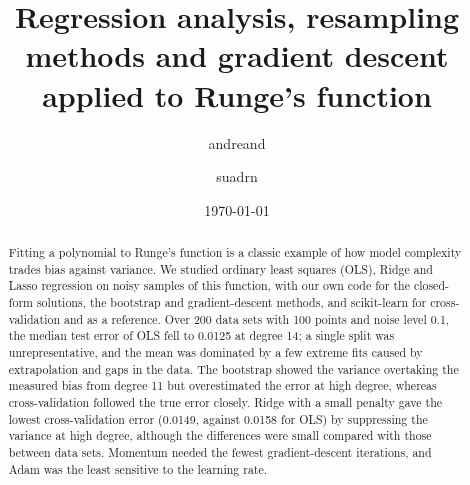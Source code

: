 \documentclass[english,notitlepage,reprint,nofootinbib,floatfix]{revtex4-2}
\begin{document}
\title{Regression analysis, resampling methods and gradient descent applied to Runge's function}
\author{andreand}
\author{suadrn}
\date{\today}

\begin{abstract}
Fitting a polynomial to Runge's function is a classic example of how model complexity trades bias against variance. We studied ordinary least squares (OLS), Ridge and Lasso regression on noisy samples of this function, with our own code for the closed-form solutions, the bootstrap and gradient-descent methods, and scikit-learn for cross-validation and as a reference. Over 200 data sets with 100 points and noise level 0.1, the median test error of OLS fell to 0.0125 at degree 14; a single split was unrepresentative, and the mean was dominated by a few extreme fits caused by extrapolation and gaps in the data. The bootstrap showed the variance overtaking the measured bias from degree 11 but overestimated the error at high degree, whereas cross-validation followed the true error closely. Ridge with a small penalty gave the lowest cross-validation error (0.0149, against 0.0158 for OLS) by suppressing the variance at high degree, although the differences were small compared with those between data sets. Momentum needed the fewest gradient-descent iterations, and Adam was the least sensitive to the learning rate.
\end{abstract}

\maketitle









\end{document}
